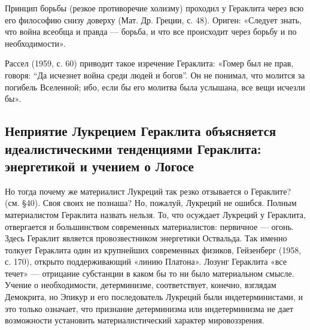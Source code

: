 Принцип  борьбы (резкое  противоречие  холизму)  проходил у  Гераклита
через  всю его  философию  снизу  доверху (Мат.  Др.  Греции, с.  48).
Ориген: «Следует знать,  что война всеобща и правда ---  борьба, и что
все происходит через борьбу и по необходимости».

Рассел (1959, с. 60) приводит такое изречение Гераклита: «Гомер был не
прав,  говоря:  ``Да исчезнет  война  среди  людей  и богов''.  Он  не
понимал, что молится  за погибель Вселенной; ибо, если  бы его молитва
была услышана, все вещи исчезли бы».

\subsection{Неприятие Лукрецием Гераклита объясняется идеалистическими
тенденциями Гераклита: энергетикой и учением о Логосе}

Но  тогда  почему  же  материалист Лукреций  так  резко  отзывается  о
Гераклите? (см.  §40). Своя  своих не  познаша? Но,  пожалуй, Лукреций
не  ошибся.   Полным  материалистом  Гераклита  назвать   нельзя.  То,
что  осуждает   Лукреций  у  Гераклита,  отвергается   и  большинством
современных  материалистов:   первичное  ---  огонь.   Здесь  Гераклит
является  провозвестником  энергетики  Оствальда. Так  именно  толкует
Гераклита один из крупнейших современных физиков, Гейзенберг (1958, с.
170), открыто  поддерживающий «линию  Платона». Лозунг  Гераклита «все
течет» ---  отрицание субстанции  в каком бы  то ни  было материальном
смысле. Учение о  необходимости, детерминизме, соответствует, конечно,
взглядам  Демокрита,  но  Эпикур  и его  последователь  Лукреций  были
индетерминистами, и  это только  означает, что  признание детерминизма
или индетерминизма  не дает возможности  установить материалистический
характер мировоззрения.

